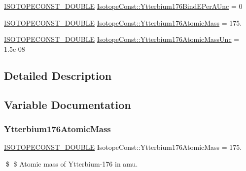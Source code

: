 \begin{DoxyCompactItemize}
\mbox{\hyperlink{group___isotope_const-_macros_ga8f45a7272ce02c0b4c65c44636ed719a}{I\+S\+O\+T\+O\+P\+E\+C\+O\+N\+S\+T\+\_\+\+D\+O\+U\+B\+LE}} \mbox{\hyperlink{group___isotope_const-_ytterbium-_yb176_ga7fe546cff9a67bd685c1ce18ed04d026}{Isotope\+Const\+::\+Ytterbium176\+Bind\+E\+Per\+A\+Unc}} = 0
\item 
\mbox{\hyperlink{group___isotope_const-_macros_ga8f45a7272ce02c0b4c65c44636ed719a}{I\+S\+O\+T\+O\+P\+E\+C\+O\+N\+S\+T\+\_\+\+D\+O\+U\+B\+LE}} \mbox{\hyperlink{group___isotope_const-_ytterbium-_yb176_ga829421941adfeaf8641bb5234cb25d5a}{Isotope\+Const\+::\+Ytterbium176\+Atomic\+Mass}} = 175.
\item 
\mbox{\hyperlink{group___isotope_const-_macros_ga8f45a7272ce02c0b4c65c44636ed719a}{I\+S\+O\+T\+O\+P\+E\+C\+O\+N\+S\+T\+\_\+\+D\+O\+U\+B\+LE}} \mbox{\hyperlink{group___isotope_const-_ytterbium-_yb176_gacea21d2ef50861a3a69a4db9b7b40627}{Isotope\+Const\+::\+Ytterbium176\+Atomic\+Mass\+Unc}} = 1.\+5e-\/08
\end{DoxyCompactItemize}


\subsection{Detailed Description}


\subsection{Variable Documentation}
\mbox{\label{group___isotope_const-_ytterbium-_yb176_ga829421941adfeaf8641bb5234cb25d5a}} 
\subsubsection{\texorpdfstring{Ytterbium176\+Atomic\+Mass}{Ytterbium176AtomicMass}}
{\footnotesize\ttfamily \mbox{\hyperlink{group___isotope_const-_macros_ga8f45a7272ce02c0b4c65c44636ed719a}{I\+S\+O\+T\+O\+P\+E\+C\+O\+N\+S\+T\+\_\+\+D\+O\+U\+B\+LE}} Isotope\+Const\+::\+Ytterbium176\+Atomic\+Mass = 175.}

\$ \$ Atomic mass of Ytterbium-\/176 in amu. \mbox{\label{group___isotope_const-_ytterbium-_yb176_gacea21d2ef50861a3a69a4db9b7b40627}} 
